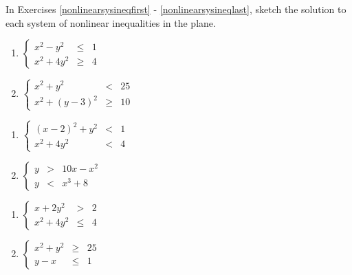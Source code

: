 \documentclass{ximera}
\begin{document}
	\author{Stitz-Zeager}


\label{ExercisesforNonLinearInequalities}

In Exercises \ref{nonlinearsysineqfirst} - \ref{nonlinearsysineqlast}, sketch the solution to each system of nonlinear inequalities in the plane.


\begin{multicols}{2}
\begin{enumerate}


\item $\left\{\begin{array}{rcr}  x^{2} - y^{2} & \leq & 1 \\ x^{2} + 4y^{2} & \geq & 4  \end{array} \right.$ \label{nonlinearsysineqfirst}
\item $\left\{\begin{array}{rcr}  x^{2} + y^{2} & < & 25 \\ x^{2} + (y - 3)^{2} & \geq & 10  \end{array} \right.$

\setcounter{HW}{\value{enumi}}
\end{enumerate}
\end{multicols}

\begin{multicols}{2}
\begin{enumerate}
\setcounter{enumi}{\value{HW}}

\item $\left\{\begin{array}{rcr}  (x - 2)^{2} + y^{2} & < & 1 \\ x^{2} + 4y^{2} & < & 4  \end{array} \right.$
\item $\left\{\begin{array}{rcr}  y & > & 10x - x^{2} \\ y & < & x^{3} + 8  \end{array} \right.$

\setcounter{HW}{\value{enumi}}
\end{enumerate}
\end{multicols}

\begin{multicols}{2}
\begin{enumerate}
\setcounter{enumi}{\value{HW}}

\item $\left\{\begin{array}{rcr}  x + 2y^{2} & > & 2 \\ x^{2} + 4y^{2} & \leq & 4  \end{array} \right.$
\item $\left\{\begin{array}{rcr}  x^{2} + y^{2} & \geq & 25 \\ y - x & \leq & 1  \end{array} \right.$ \label{nonlinearsysineqlast}

\setcounter{HW}{\value{enumi}}
\end{enumerate}
\end{multicols}
\end{document}
